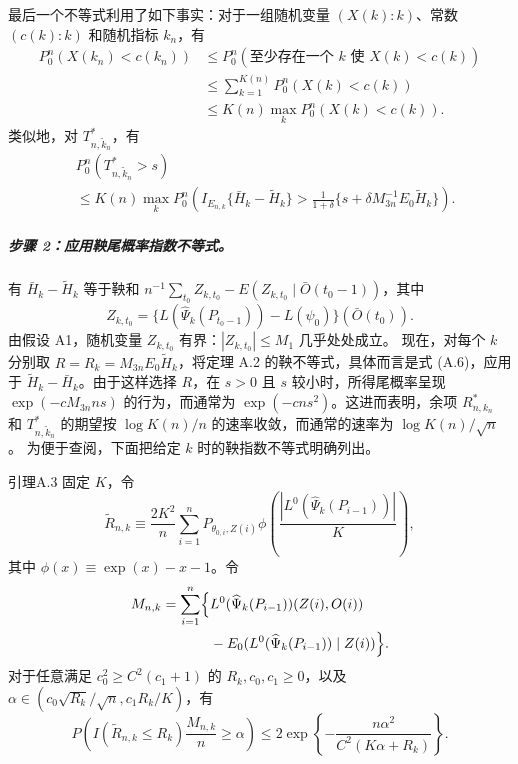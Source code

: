 最后一个不等式利用了如下事实：对于一组随机变量 $(X(k):k)$、常数 $(c(k):k)$ 和随机指标 $k_n$，有
\[
\begin{aligned}
P_0^n(X(k_n)<c(k_n))
&\le P_0^n(\text{至少存在一个 }k\text{ 使 }X(k)<c(k))\\
&\le\sum_{k=1}^{K(n)}P_0^n(X(k)<c(k))\\
&\le K(n)\max_kP_0^n(X(k)<c(k)).
\end{aligned}
\]
类似地，对 $T^*_{n,\widetilde k_n}$，有
\[
\begin{aligned}
&P_0^n(T^*_{n,\widetilde k_n}>s)\\
&\le K(n)\max_kP_0^n\left(I_{E_{n,k}}\{\bar H_k-\widetilde H_k\}
 >\frac1{1+\delta}\{s+\delta M_{3n}^{-1}E_0\widetilde H_k\}\right).
\end{aligned}
\]

\subparagraph{步骤 2：应用鞅尾概率指数不等式。}
有 $\bar H_k-\widetilde H_k$ 等于鞅和
$n^{-1}\sum_{t_0}Z_{k,t_0}-E(Z_{k,t_0}\mid\bar O(t_0-1))$，其中
\[
Z_{k,t_0}=\{L(\widehat\Psi_k(P_{t_0-1}))-L(\psi_0)\}(\bar O(t_0)).
\]
由假设 A1，随机变量 $Z_{k,t_0}$ 有界：$|Z_{k,t_0}|\le M_1$ 几乎处处成立。
现在，对每个 $k$ 分别取 $R=R_k=M_{3n}E_0\widetilde H_k$，将定理 A.2 的鞅不等式，具体而言是式 (A.6)，应用于 $\widetilde H_k-\bar H_k$。由于这样选择 $R$，在 $s>0$ 且 $s$ 较小时，所得尾概率呈现 $\exp(-cM_{3n}ns)$ 的行为，而通常为 $\exp(-cns^2)$。这进而表明，余项 $R^*_{n,k_n}$ 和 $T^*_{n,\widetilde k_n}$ 的期望按 $\log K(n)/n$ 的速率收敛，而通常的速率为 $\log K(n)/\sqrt n$。
为便于查阅，下面把给定 $k$ 时的鞅指数不等式明确列出。

\begin{bookresult}{引理}{A.3}
固定 $K$，令
\[
\widetilde R_{n,k}\equiv\frac{2K^2}{n}\sum_{i=1}^nP_{\theta_{0,i},Z(i)}
 \phi\left(\frac{|L^0(\widehat\Psi_k(P_{i-1}))|}{K}\right),
\]
其中 $\phi(x)\equiv\exp(x)-x-1$。令
\[
\begin{aligned}
M_{n,k}=\sum_{i=1}^n\Bigl\{
&L^0(\widehat\Psi_k(P_{i-1}))(Z(i),O(i))\\
&-E_0(L^0(\widehat\Psi_k(P_{i-1}))\mid Z(i))\Bigr\}.
\end{aligned}
\]
对于任意满足 $c_0^2\ge C^2(c_1+1)$ 的 $R_k,c_0,c_1\ge0$，以及
$\alpha\in(c_0\sqrt{R_k}/\sqrt n,c_1R_k/K)$，有
\[
P\left(I(\widetilde R_{n,k}\le R_k)\frac{M_{n,k}}n\ge\alpha\right)
 \le2\exp\left\{-\frac{n\alpha^2}{C^2(K\alpha+R_k)}\right\}.
\]
\end{bookresult}

